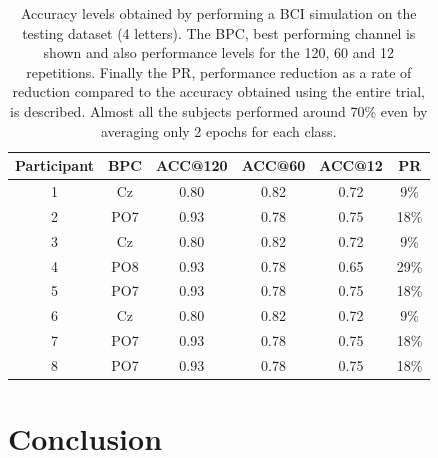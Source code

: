 \documentclass[entropy,article,submit,moreauthors,pdftex,10pt,a4paper]{mdpi}
\begin{document}
\begin{table}[H]
\caption{Accuracy levels obtained by performing a BCI simulation on the testing dataset (4 letters). The BPC, best performing channel is shown and also performance levels for the 120, 60 and 12 repetitions. Finally the PR, performance reduction as a rate of reduction compared to the accuracy obtained using the entire trial, is described.  Almost all the subjects performed around 70\% even by averaging only 2 epochs for each class.}
\centering
\begin{tabular}{cccccc}
\toprule
\textbf{Participant}	& \textbf{BPC}	& \textbf{ACC@120}	& \textbf{ACC@60}	&  \textbf{ACC@12} & \textbf{PR}\\
\midrule
1 & Cz &   0.80 &   0.82 &   0.72 & 9\% \\
2 & PO7 &   0.93 &   0.78 &   0.75 & 18\%\\
3 & Cz &   0.80 &   0.82 &   0.72 & 9\%\\
4 & PO8 &   0.93 &   0.78 &   0.65 & 29\%\\
5 & PO7 &   0.93 &   0.78 &   0.75 & 18\%\\
6 & Cz &   0.80 &   0.82 &   0.72 & 9\%\\
7 & PO7 &   0.93 &   0.78 &   0.75 & 18\%\\
8 & PO7 &   0.93 &   0.78 &   0.75 & 18\%\\
\bottomrule
\end{tabular}
\label{tab:singletrialreduction}
\end{table}

%
%
%
%
%
%


\section{Conclusion}
\end{document}

